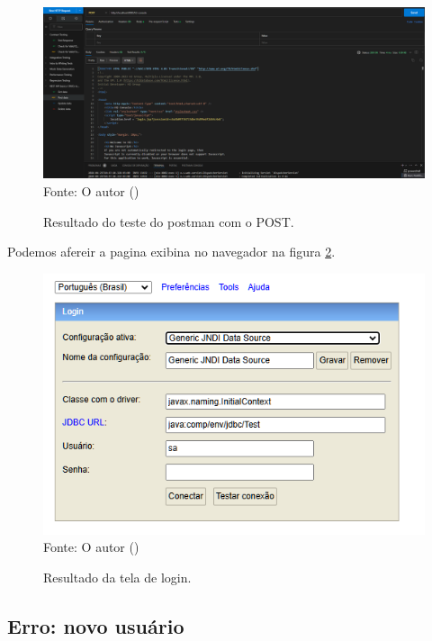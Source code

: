 \begin{figure}[H]
\center
  \caption{Resultado do teste do postman com o POST.}
  \includegraphics[width=\textwidth]{figure/postman_POST.png}
  \label{fig:post}
  \flushleft %
    {\fontsize{10pt}{\baselineskip}\selectfont
    Fonte: O autor (\the\year) }
\end{figure}


\par Podemos afereir a pagina exibina no navegador na figura \ref{fig:nav}.

\begin{figure}[H]
\center
  \caption{Resultado da tela de login.}
  \includegraphics[width=\textwidth]{figure/login_nav.png}
  \label{fig:nav}
  \flushleft %
    {\fontsize{10pt}{\baselineskip}\selectfont
    Fonte: O autor (\the\year) }
\end{figure}


\subsection{Erro: novo usuário}

